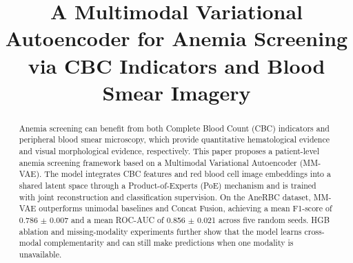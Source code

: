 \documentclass[conference,letterpaper]{IEEEtran}
\begin{document}
\title{A Multimodal Variational Autoencoder for Anemia Screening via CBC Indicators and Blood Smear Imagery}

\author{
\and
{}
\and
{}
\and
{}
}

\maketitle

\begingroup
\renewcommand\thefootnote{}
\endgroup

\begin{abstract}
Anemia screening can benefit from both Complete Blood Count (CBC) indicators and peripheral blood smear microscopy, which provide quantitative hematological evidence and visual morphological evidence, respectively. This paper proposes a patient-level anemia screening framework based on a Multimodal Variational Autoencoder (MM-VAE). The model integrates CBC features and red blood cell image embeddings into a shared latent space through a Product-of-Experts (PoE) mechanism and is trained with joint reconstruction and classification supervision. On the AneRBC dataset, MM-VAE outperforms unimodal baselines and Concat Fusion, achieving a mean F1-score of 0.786 $\pm$ 0.007 and a mean ROC-AUC of 0.856 $\pm$ 0.021 across five random seeds. HGB ablation and missing-modality experiments further show that the model learns cross-modal complementarity and can still make predictions when one modality is unavailable.
\end{abstract}
\end{document}
